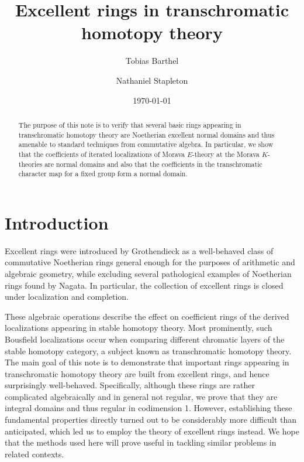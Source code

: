\documentclass[oneside]{amsart}
\title{Excellent rings in transchromatic homotopy theory}
\author{Tobias Barthel}
\author{Nathaniel Stapleton}
\date{\today}
\def\biblio{}
\theoremstyle{definition}
\theoremstyle{remark}
\theoremstyle{theorem}
\numberwithin{equation}{section}
\begin{document}


\begin{abstract}
The purpose of this note is to verify that several basic rings appearing in transchromatic homotopy theory are Noetherian excellent normal domains and thus amenable to standard techniques from commutative algebra. In particular, we show that the coefficients of iterated localizations of Morava $E$-theory at the Morava $K$-theories are normal domains and also that the coefficients in the transchromatic character map for a fixed group form a normal domain.
\end{abstract}

 
\maketitle

\def\biblio{}

\section{Introduction}

Excellent rings were introduced by Grothendieck as a well-behaved class of commutative Noetherian rings general enough for the purposes of arithmetic and algebraic geometry, %
while excluding several pathological examples of Noetherian rings found by Nagata. In particular, the collection of excellent rings is closed under localization and completion. 

These algebraic operations describe the effect on coefficient rings of the derived localizations appearing in stable homotopy theory.  Most prominently, such Bousfield localizations occur when comparing different chromatic layers of the stable homotopy category, a subject known as transchromatic homotopy theory. The main goal of this note is to demonstrate that important rings appearing in transchromatic homotopy theory are built from excellent rings, and hence surprisingly well-behaved. Specifically, although these rings are rather complicated algebraically and in general not regular, we prove that they are integral domains and thus regular in codimension 1. However, establishing these fundamental properties directly turned out to be considerably more difficult than anticipated, which led us to employ the theory of excellent rings instead. We hope that the methods used here will prove useful in tackling similar problems in related contexts. 
\end{document}
